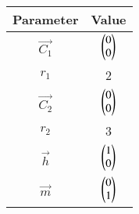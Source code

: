
\begin{center}
\begin{tabular}{|c|c|}
\hline
\textbf{Parameter}	&\textbf{Value}\\ \hline
$\vec{C_1}$	&	$\begin{pmatrix}0\\0\end{pmatrix}$\\ \hline
$r_1$		&	2\\ \hline
$\vec{C_2}$	&	$\begin{pmatrix}0\\0\end{pmatrix}$\\ \hline
$r_2$		&	3\\ \hline
$\vec{h}$	&	$\begin{pmatrix}1\\0\end{pmatrix}$\\ \hline
$\vec{m}$	&	$\begin{pmatrix}0\\1\end{pmatrix}$\\ \hline
\end{tabular}
\end{center}
